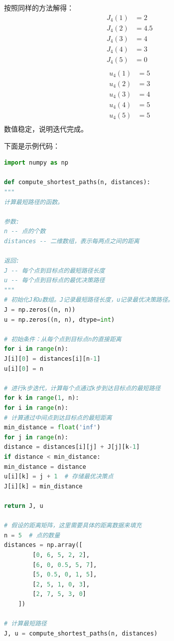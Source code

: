 \begin{example}
    按照同样的方法解得：
    \begin{equation}
        \begin{aligned}
            J_4(1) & = 2   \\
            J_4(2) & = 4.5 \\
            J_4(3) & = 4   \\
            J_4(4) & = 3   \\
            J_4(5) & = 0   \\
        \end{aligned}
    \end{equation}
    \begin{equation}
        \begin{aligned}
            u_4(1) & = 5 \\
            u_4(2) & = 3 \\
            u_4(3) & = 4 \\
            u_4(4) & = 5 \\
            u_4(5) & = 5 \\
        \end{aligned}
    \end{equation}
    数值稳定，说明迭代完成。

    下面是示例代码：

\end{example}

\begin{lstlisting}[language=python]
import numpy as np

def compute_shortest_paths(n, distances):
"""
计算最短路径的函数。

参数:
n -- 点的个数
distances -- 二维数组，表示每两点之间的距离

返回:
J -- 每个点到目标点的最短路径长度
u -- 每个点到目标点的最优决策路径
"""
# 初始化J和u数组。J记录最短路径长度，u记录最优决策路径。
J = np.zeros((n, n))
u = np.zeros((n, n), dtype=int)

# 初始条件：从每个点到目标点n的直接距离
for i in range(n):
J[i][0] = distances[i][n-1]
u[i][0] = n

# 进行k步迭代，计算每个点通过k步到达目标点的最短路径
for k in range(1, n):
for i in range(n):
# 计算通过中间点到达目标点的最短距离
min_distance = float('inf')
for j in range(n):
distance = distances[i][j] + J[j][k-1]
if distance < min_distance:
min_distance = distance
u[i][k] = j + 1  # 存储最优决策点
J[i][k] = min_distance

return J, u

# 假设的距离矩阵，这里需要具体的距离数据来填充
n = 5  # 点的数量
distances = np.array([
        [0, 6, 5, 2, 2],
        [6, 0, 0.5, 5, 7],
        [5, 0.5, 0, 1, 5],
        [2, 5, 1, 0, 3],
        [2, 7, 5, 3, 0]
    ])

# 计算最短路径
J, u = compute_shortest_paths(n, distances)
\end{lstlisting}

